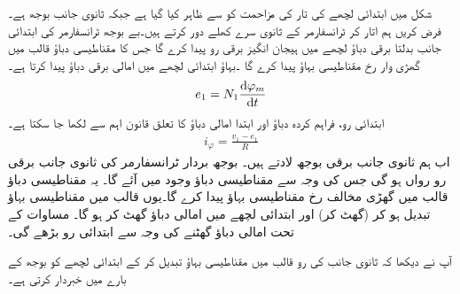 شکل  میں ابتدائی لچھے کی تار کی مزاحمت کو  سے ظاہر کیا گیا ہے جبکہ ثانوی جانب بوجھ  ہے۔ فرض کریں ہم   اتار کر  ٹرانسفارمر کے ثانوی سرے کھلے دور کرتے ہیں۔بے بوجھ ٹرانسفارمر کی ابتدائی جانب بدلتا برقی دباؤ   لچھے میں ہیجان انگیز برقی رو  پیدا کرے گا  جس کا  مقناطیسی دباؤ  قالب میں گھڑی وار رخ  مقناطیسی بہاؤ  پیدا کرے گا ۔بہاؤ   ابتدائی لچھے میں  امالی برقی دباؤ پیدا کرتا ہے۔
\begin{align}\label{مساوات_ٹرانسفارمر_دباو_برابر_بہاو_تفرق}
e_1=N_1 \frac{\dif \varphi_m}{\dif t}
\end{align}
ابتدائی رو، فراہم کردہ دباؤ اور ابتدا امالی دباؤ کا تعلق قانون اہم سے لکھا جا سکتا ہے۔
\begin{align}\label{مساوات_ٹرانسفارمر_امالی_دباو_اور_رو}
i_{\varphi}=\frac{v_1-e_1}{R}
\end{align} 
اب ہم ثانوی جانب  برقی بوجھ  لادتے ہیں۔  بوجھ بردار ٹرانسفارمر  کی   ثانوی جانب  برقی رو  رواں ہو گی جس کی وجہ سے  مقناطیسی دباؤ وجود میں آئے گا۔ یہ مقناطیسی دباؤ  قالب میں گھڑی  مخالف رخ مقناطیسی بہاؤ   پیدا کرے گا۔یوں قالب میں  مقناطیسی بہاؤ تبدیل  ہو کر  (گھٹ کر)
  اور ابتدائی لچھے میں امالی دباؤ گھٹ کر  ہو  گا۔ مساوات  کے تحت امالی دباؤ گھٹنے کی وجہ سے ابتدائی رو  بڑھے گی۔ 

آپ نے دیکھا کہ ثانوی جانب کی رو قالب میں مقناطیسی بہاؤ  تبدیل کر کے ابتدائی لچھے کو بوجھ کے بارے میں خبردار کرتی ہے۔

